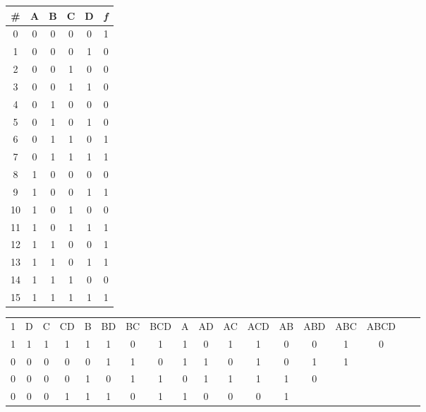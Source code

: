 \documentclass[a4paper, 14pt]{extarticle}
\begin{document}
\begin{center}
  \begin{adjustbox}{max width=1\textwidth}
    \begin{tabular}{|c|c|c|c|c|c|}
      \hline
      \# & \bfseries A & \bfseries B & \bfseries C & \bfseries D & \bfseries \itshape f \\
      \hline
      0 & 0 & 0 & 0 & 0 & 1 \\
      \hline
      1 & 0 & 0 & 0 & 1 & 0 \\
      \hline
      2 & 0 & 0 & 1 & 0 & 0 \\
      \hline
      3 & 0 & 0 & 1 & 1 & 0 \\
      \hline
      4 & 0 & 1 & 0 & 0 & 0 \\
      \hline
      5 & 0 & 1 & 0 & 1 & 0 \\
      \hline
      6 & 0 & 1 & 1 & 0 & 1 \\
      \hline
      7 & 0 & 1 & 1 & 1 & 1 \\
      \hline
      8 & 1 & 0 & 0 & 0 & 0 \\
      \hline
      9 & 1 & 0 & 0 & 1 & 1 \\
      \hline
      10 & 1 & 0 & 1 & 0 & 0 \\
      \hline
      11 & 1 & 0 & 1 & 1 & 1 \\
      \hline
      12 & 1 & 1 & 0 & 0 & 1 \\
      \hline
      13 & 1 & 1 & 0 & 1 & 1 \\
      \hline
      14 & 1 & 1 & 1 & 0 & 0 \\
      \hline
      15 & 1 & 1 & 1 & 1 & 1 \\
      \hline
    \end{tabular}
    \hspace{10pt}\renewcommand{\arraystretch}{1.017}
    \begin{tabular}{|c|c|c|c|c|c|c|c|c|c|c|c|c|c|c|c|c|c}
      \cline{1-17}
      1 & D & C & CD & B & BD & BC & BCD & A & AD & AC & ACD & AB & ABD & ABC & ABCD \\
      \cline{1-17}
      1 & 1 & 1 & 1 & 1 & 1 & 0 & 1 & 1 & 0 & 1 & 1 & 0 & 0 & 1 & 0 \\
      \cline{1-16}
      0 & 0 & 0 & 0 & 0 & 1 & 1 & 0 & 1 & 1 & 0 & 1 & 0 & 1 & 1 \\
      \cline{1-15}
      0 & 0 & 0 & 0 & 1 & 0 & 1 & 1 & 0 & 1 & 1 & 1 & 1 & 0 \\
      \cline{1-14}
      0 & 0 & 0 & 1 & 1 & 1 & 0 & 1 & 1 & 0 & 0 & 0 & 1 \\

\end{tabular}
\end{adjustbox}
\end{center}
\end{document}
